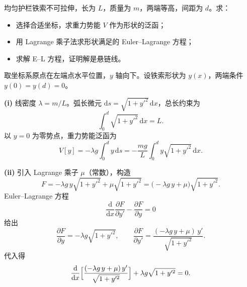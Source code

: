 \begin{question}
均匀护栏铁索不可拉伸，长为 \(L\)，质量为 \(m\)，两端等高，间距为 \(d\)。求：
\begin{itemize}
  \item[\textup{(i)}] 选择合适坐标，求重力势能 \(V\) 作为形状的泛函；
  \item[\textup{(ii)}] 用 Lagrange 乘子法求形状满足的 Euler--Lagrange 方程；
  \item[\textup{(iii)}] 求解 E--L 方程，证明解是悬链线。
\end{itemize}

\begin{solution}
取坐标系原点在左端点水平位置，\(y\) 轴向下。设铁索形状为 \(y(x)\)，两端条件 \(y(0)=y(d)=0\)。

\textbf{(i)} 线密度 \(\lambda = m/L\)。弧长微元 \(\mathrm ds = \sqrt{1+y'^2}\,\mathrm dx\)，总长约束为
\[
\int_0^d \sqrt{1+y'^2}\,\mathrm dx = L .
\]
以 \(y=0\) 为零势点，重力势能泛函为
\[
V[y] = -\lambda g \int_0^d y\,\mathrm ds
= -\frac{mg}{L}\int_0^d y\sqrt{1+y'^2}\,\mathrm dx .
\]

\textbf{(ii)} 引入 Lagrange 乘子 \(\mu\)（常数），构造
\[
F = -\lambda g\, y\sqrt{1+y'^2} + \mu\sqrt{1+y'^2}
= \bigl(-\lambda g\, y + \mu\bigr)\sqrt{1+y'^2}.
\]
Euler--Lagrange 方程
\[
\frac{\mathrm d}{\mathrm dx}\frac{\partial F}{\partial y'} - \frac{\partial F}{\partial y} = 0
\]
给出
\[
\frac{\partial F}{\partial y} = -\lambda g\sqrt{1+y'^2},
\qquad
\frac{\partial F}{\partial y'} = \frac{(-\lambda g\, y + \mu)\,y'}{\sqrt{1+y'^2}} .
\]
代入得
\[
\frac{\mathrm d}{\mathrm dx}\Bigl[\frac{(-\lambda g\, y + \mu)\,y'}{\sqrt{1+y'^2}}\Bigr]
+ \lambda g\sqrt{1+y'^2} = 0 .
\]


\end{solution}
\end{question}
